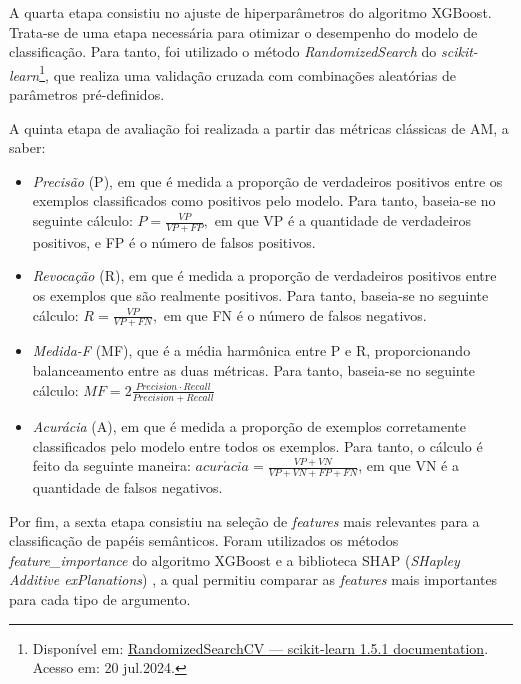 A quarta etapa consistiu no ajuste de hiperparâmetros do algoritmo
XGBoost. Trata-se de uma etapa necessária para otimizar o desempenho do
modelo de classificação. Para tanto, foi utilizado o método
\emph{RandomizedSearch} do \emph{scikit-learn}\footnote{Disponível em:
  \href{https://scikit-learn.org/stable/modules/generated/sklearn.model_selection.RandomizedSearchCV.html}{RandomizedSearchCV
  --- scikit-learn 1.5.1 documentation}. Acesso em: 20 jul.2024.}, que
realiza uma validação cruzada com combinações aleatórias de parâmetros
pré-definidos.

A quinta etapa de avaliação foi realizada a partir das métricas
clássicas de AM, a saber:

\begin{itemize}
\item
  \emph{Precisão} (P), em que é medida a proporção de verdadeiros
  positivos entre os exemplos classificados como positivos pelo modelo.
  Para tanto, baseia-se no seguinte cálculo: \(P = \frac{VP}{VP + FP},\)
  em que VP é a quantidade de verdadeiros positivos, e FP é o número de
  falsos positivos.
\item
  \emph{Revocação} (R), em que é medida a proporção de verdadeiros
  positivos entre os exemplos que são realmente positivos. Para tanto,
  baseia-se no seguinte cálculo: \(R = \frac{VP}{VP + FN},\) em que FN é
  o número de falsos negativos.
\item
  \emph{Medida-F} (MF), que é a média harmônica entre P e R,
  proporcionando balanceamento entre as duas métricas. Para tanto,
  baseia-se no seguinte cálculo:
  \(MF = 2\frac{Precision \cdot Recall}{Precision + Recall}\)
\item
  \emph{Acurácia} (A), em que é medida a proporção de exemplos
  corretamente classificados pelo modelo entre todos os exemplos. Para
  tanto, o cálculo é feito da seguinte maneira:
  \(acur\acute{a}cia = \frac{VP + VN}{VP + VN + FP + FN}\), em que VN é a
  quantidade de falsos negativos.
\end{itemize}

Por fim, a sexta etapa consistiu na seleção de \emph{features} mais
relevantes para a classificação de papéis semânticos. Foram utilizados
os métodos \emph{feature\_importance} do algoritmo XGBoost e a
biblioteca SHAP (\emph{SHapley Additive exPlanations}) \cite{lundberg2017}, a qual permitiu comparar as \emph{features} mais importantes para
cada tipo de argumento.
